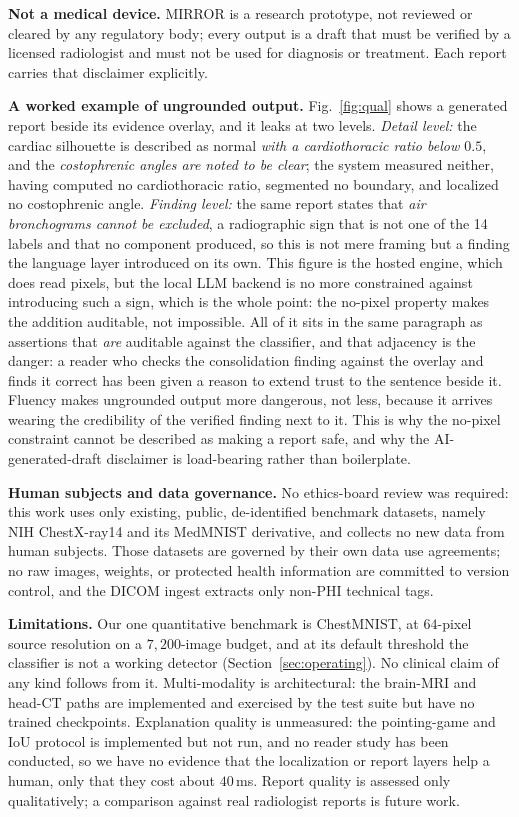 \documentclass[conference]{IEEEtran}
\newcommand{\rih}[1]{\textbf{#1}\enspace\ignorespaces}
\begin{document}
\rih{Not a medical device.} MIRROR is a research prototype, not reviewed or cleared
by any regulatory body; every output is a draft that must be verified by a licensed
radiologist and must not be used for diagnosis or treatment. Each report carries
that disclaimer explicitly.

\rih{A worked example of ungrounded output.} Fig.~\ref{fig:qual} shows a generated
report beside its evidence overlay, and it leaks at two levels. \emph{Detail level:}
the cardiac silhouette is described as normal \emph{with a cardiothoracic ratio below
$0.5$}, and the \emph{costophrenic angles are noted to be clear}; the system measured
neither, having computed no cardiothoracic ratio, segmented no boundary, and
localized no costophrenic angle. \emph{Finding level:} the same report states that
\emph{air bronchograms cannot be excluded}, a radiographic sign that is not one of
the 14 labels and that no component produced, so this is not mere framing but a
finding the language layer introduced on its own. This figure is the hosted engine,
which does read pixels, but the local LLM backend is no more constrained against
introducing such a sign, which is the whole point: the no-pixel property makes the
addition auditable, not impossible. All of it sits in the same paragraph as
assertions that \emph{are} auditable against the classifier, and that adjacency is
the danger: a reader who checks the consolidation finding against the overlay and
finds it correct has been given a reason to extend trust to the sentence beside it.
Fluency makes ungrounded output more dangerous, not less, because it arrives wearing
the credibility of the verified finding next to it. This is why the no-pixel
constraint cannot be described as making a report safe, and why the
AI-generated-draft disclaimer is load-bearing rather than boilerplate.

\rih{Human subjects and data governance.} No ethics-board review was required: this
work uses only existing, public, de-identified benchmark datasets, namely NIH
ChestX-ray14 and its MedMNIST derivative, and collects no new data from human
subjects. Those datasets are governed by their own data use agreements; no raw
images, weights, or protected health information are committed to version control,
and the DICOM ingest extracts only non-PHI technical tags.

\rih{Limitations.} Our one quantitative benchmark is ChestMNIST, at $64$-pixel
source resolution on a $7{,}200$-image budget, and at its default threshold the
classifier is not a working detector (Section~\ref{sec:operating}). No clinical
claim of any kind follows from it. Multi-modality is architectural: the brain-MRI
and head-CT paths are implemented and exercised by the test suite but have no
trained checkpoints. Explanation quality is unmeasured: the pointing-game and IoU
protocol is implemented but not run, and no reader study has been conducted, so we
have no evidence that the localization or report layers help a human, only that they
cost about $40$\,ms. Report quality is assessed only qualitatively; a comparison
against real radiologist reports is future work.
\end{document}
